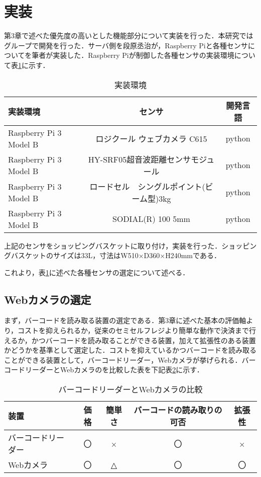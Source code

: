 

\section{実装}

第3章で述べた優先度の高いとした機能部分について実装を行った．本研究ではグループで開発を行った．サーバ側を段原丞治が，Raspberry Piと各種センサについてを筆者が実装した．Raspberry Piが制御した各種センサの実装環境について表\ref{jissou}に示す．


\begin{table}[htb]
\begin{center}
\caption{実装環境}
\begin{tabular}{|l|c|c|} \hline
実装環境 & センサ & 開発言語 \\ \hline \hline
Raspberry Pi 3 Model B & ロジクール ウェブカメラ C615 & python \\
Raspberry Pi 3 Model B & HY-SRF05超音波距離センサモジュール & python \\
Raspberry Pi 3 Model B & ロードセル　シングルポイント(ビーム型)3kg & python \\
Raspberry Pi 3 Model B & SODIAL(R) 100 5mm & python \\ \hline
\end{tabular}
\label{jissou}
\end{center}
\end{table}


上記のセンサをショッピングバスケットに取り付け，実装を行った．ショッピングバスケットのサイズは33L，寸法はW510×D360×H240mmである．

これより，表\ref{jissou}に述べた各種センサの選定について述べる．



\subsection{Webカメラの選定}


まず，バーコードを読み取る装置の選定である．第3章に述べた基本の評価軸より，コストを抑えられるか，従来のセミセルフレジより簡単な動作で決済まで行えるか，かつバーコードを読み取ることができる装置，加えて拡張性のある装置かどうかを基準として選定した．コストを抑えているかつバーコードを読み取ることができる装置として，バーコードリーダー，Webカメラが挙げられる．バーコードリーダーとWebカメラのを比較した表を下記表\ref{came}に示す．


\begin{table}[htb]
\begin{center}
\caption{バーコードリーダーとWebカメラの比較}
\begin{tabular}{|l|c|c|c|c|} \hline
装置 & 価格 & 簡単さ &バーコードの読み取りの可否 & 拡張性 \\ \hline \hline
バーコードリーダー & 〇 & × & 〇 & × \\
Webカメラ & 〇 & △ & 〇 &  〇 \\ \hline
\end{tabular}
\label{came}
\end{center}
\end{table}


